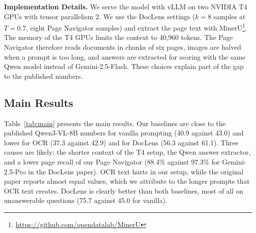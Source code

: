 \textbf{Implementation Details.} We serve the model with vLLM \cite{kwon2023vllm} on two NVIDIA T4 GPUs with tensor parallelism 2. We use the DocLens settings ($k=8$ samples at $T=0.7$, eight Page Navigator samples) and extract the page text with MinerU\footnote{\url{https://github.com/opendatalab/MinerU}}. The memory of the T4 GPUs limits the context to 40,960 tokens. The Page Navigator therefore reads documents in chunks of six pages, images are halved when a prompt is too long, and answers are extracted for scoring with the same Qwen model instead of Gemini-2.5-Flash. These choices explain part of the gap to the published numbers.

\subsection{Main Results}
\label{sec:main}
Table~\ref{tab:main} presents the main results. Our baselines are close to the published Qwen3-VL-8B numbers for vanilla prompting (40.9 against 43.0) and lower for OCR (37.3 against 42.9) and for DocLens (56.3 against 61.1). Three causes are likely: the shorter context of the T4 setup, the Qwen answer extractor, and a lower page recall of our Page Navigator (88.4\% against 97.3\% for Gemini-2.5-Pro in the DocLens paper). OCR text hurts in our setup, while the original paper reports almost equal values, which we attribute to the longer prompts that OCR text creates. DocLens is clearly better than both baselines, most of all on unanswerable questions (75.7 against 45.0 for vanilla).

